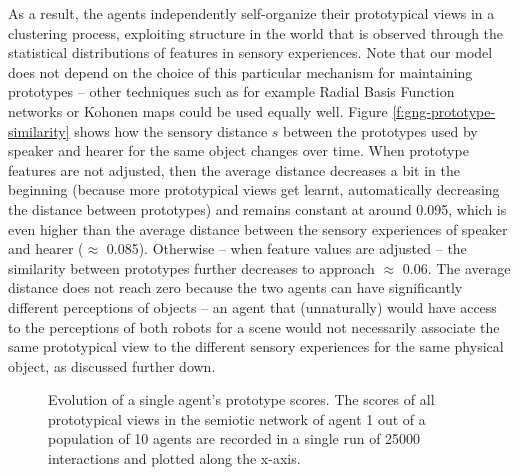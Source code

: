 As a result, the agents independently self-organize their prototypical
views in a clustering process, exploiting structure in the world
\citep{rosch76basic} that is observed through the statistical
distributions of features in sensory experiences. Note that our model
does not depend on the choice of this particular mechanism for
maintaining prototypes -- other techniques such as for example Radial
Basis Function networks \citep{poggio90networks} or Kohonen maps
\citep{kohonen82self-organized} could be used equally well. Figure
\ref{f:gng-prototype-similarity} shows how the sensory distance $s$
between the prototypes used by speaker and hearer for the same object
changes over time. When prototype features are not adjusted, then the
average distance decreases a bit in the beginning (because more
prototypical views get learnt, automatically decreasing the distance
between prototypes) and remains constant at around 0.095, which is
even higher than the average distance between the sensory experiences
of speaker and hearer ($\approx$ 0.085). Otherwise -- when feature
values are adjusted -- the similarity between prototypes further
decreases to approach $\approx$ 0.06. The average distance does not
reach zero because the two agents can have significantly different
perceptions of objects -- an agent that (unnaturally) would have
access to the perceptions of both robots for a scene would not
necessarily associate the same prototypical view to the different
sensory experiences for the same physical object, as discussed further
down.

\begin{figure}[t]
  \caption{Evolution of a single agent's prototype scores. The scores
    of all prototypical views in the semiotic network of agent 1 out
    of a population of 10 agents are recorded in a single run of 25000
    interactions and plotted along the x-axis.}
  \label{f:gng-evolution-of-prototype-scores}
\end{figure}


